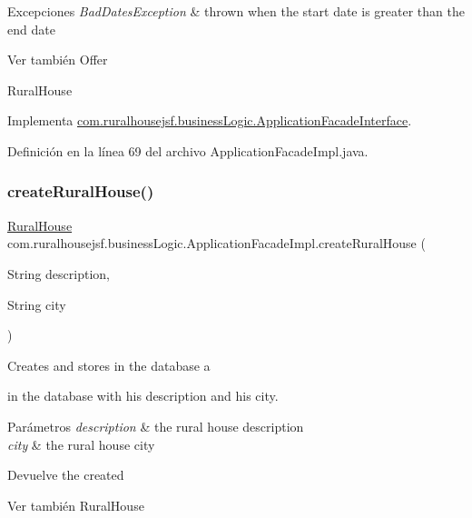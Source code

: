 \begin{DoxyExceptions}{Excepciones}
{\em Bad\+Dates\+Exception} & thrown when the start date is greater than the end date\\
\hline
\end{DoxyExceptions}
\begin{DoxySeeAlso}{Ver también}
Offer 

Rural\+House 
\end{DoxySeeAlso}


Implementa \mbox{\hyperlink{interfacecom_1_1ruralhousejsf_1_1business_logic_1_1_application_facade_interface_afaa6b314fb684fe1121f062481f2bcd9}{com.\+ruralhousejsf.\+business\+Logic.\+Application\+Facade\+Interface}}.



Definición en la línea 69 del archivo Application\+Facade\+Impl.\+java.

\mbox{\label{classcom_1_1ruralhousejsf_1_1business_logic_1_1_application_facade_impl_a48b82f812a30271878f50b99ae16a24b}} 
\subsubsection{\texorpdfstring{createRuralHouse()}{createRuralHouse()}}
{\footnotesize\ttfamily \mbox{\hyperlink{classcom_1_1ruralhousejsf_1_1domain_1_1_rural_house}{Rural\+House}} com.\+ruralhousejsf.\+business\+Logic.\+Application\+Facade\+Impl.\+create\+Rural\+House (\begin{DoxyParamCaption}\item[{String}]{description,  }\item[{String}]{city }\end{DoxyParamCaption})}

Creates and stores in the database a
\begin{DoxyCode}{0}
\end{DoxyCode}
 in the database with his description and his city.


\begin{DoxyParams}{Parámetros}
{\em description} & the rural house description \\
\hline
{\em city} & the rural house city\\
\hline
\end{DoxyParams}
\begin{DoxyReturn}{Devuelve}
the created
\begin{DoxyCode}{0}
\end{DoxyCode}

\end{DoxyReturn}
\begin{DoxySeeAlso}{Ver también}
Rural\+House 
\end{DoxySeeAlso}


